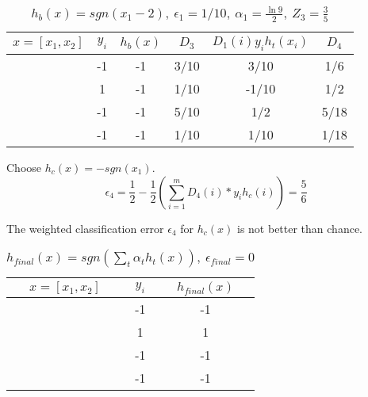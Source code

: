 \documentclass[11pt]{article}
\begin{document}
\begin{table}[H]
\centering
{\renewcommand{\arraystretch}{1.2}%
\begin{tabular}{| c | c | c | c | c | c |}
\hline
$x = [x_1, x_2]$& $y_i$ & $h_b(x)$ & $D_3$ & $D_1(i)y_ih_t(x_i)$ & $D_4$\\
\hline
[1,1] & -1 & -1&  3/10&  3/10& 1/6\\ \hline
[1,-1] & 1 &  -1&  1/10&  -1/10& 1/2\\ \hline
[-1,-1] & -1 & -1 & 5/10&  1/2& 5/18\\ \hline
[-1,1] & -1 &  -1&  1/10&  1/10& 1/18\\ \hline
\end{tabular}}
\caption{$h_b(x) = sgn(x_1 - 2), \ \epsilon_1 = 1/10, \ \alpha_1 = \frac{\ln9}{2}, \ Z_3 = \frac{3}{5}$}
\end{table}

Choose $h_c(x) = -sgn(x_1)$. 
$$\epsilon_4 = \frac{1}{2} - \frac{1}{2}(\sum_{i=1}^m D_4(i)*y_ih_c(i)) = \frac{5}{6}$$

The weighted classification error $\epsilon_4$ for $h_c(x)$ is not better than chance.

\begin{table}[H]
\centering
{\renewcommand{\arraystretch}{1.2}%
\begin{tabular}{| c | c | c |}
\hline
$x = [x_1, x_2]$& $y_i$ & $h_{final}(x)$\\
\hline
[1,1] & -1 & -1\\ \hline
[1,-1] & 1 & 1\\ \hline
[-1,-1] & -1 & -1\\ \hline
[-1,1] & -1 & -1\\ \hline
\end{tabular}}
\caption{$h_{final}(x) = sgn(\sum_{t} \alpha_th_t(x)), \ \epsilon_{final} = 0$}
\end{table}
\end{document}
